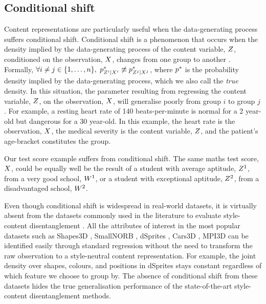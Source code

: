 \documentclass[../thesis.tex]{subfiles}
\begin{document}
\subsection{Conditional shift}

Content representations are particularly useful when the data-generating process suffers conditional shift. Conditional shift is a phenomenon that occurs when the density implied by the data-generating process of the content variable, $\myrv{z}$, conditioned on the observation, $\myrv{x}$, changes from one group to another \citep{zhangDomainAdaptationTarget2013}. Formally, $\forall i \neq j \in \{1,\dots,n\},$ $\myfunc{p}^{*}_{\myrv{z}^i | \myrv{x}^i} \not\equiv \myfunc{p}^{*}_{\myrv{z}^j | \myrv{x}^j}$, where $p^{*}$ is the probability density implied by the data-generating process, which we also call the \textit{true} density.  In this situation, the parameter resulting from regressing the content variable, $\myrv{z}$, on the observation, $\myrv{x}$, will generalise poorly from group $i$ to group $j$. For example, a resting heart rate of 140 beats-per-minute is normal for a 2 year-old but dangerous for a 30 year-old. In this example, the heart rate is the observation, $\myrv{x}$, the medical severity is the content variable, $\myrv{z}$, and the patient's age-bracket constitutes the group.

Our test score example suffers from conditional shift. The same maths test score, $\myrv{x}$, could be equally well be the result of a student with average aptitude, $\myrv{z}^1$, from a very good school, $\myrv{w}^1$, or a student with exceptional aptitude, $\myrv{z}^2$, from a disadvantaged school, $\myrv{w}^2$. 


Even though conditional shift is widespread in real-world datasets, it is virtually absent from the datasets commonly used in the literature to evaluate style-content disentanglement \citep{liuNeedLanguageDescribing2023}. All the attributes of interest in the most popular datasets such as Shapes3D \citep{kim2018disentangling}, SmallNORB \citep{lecun2004learning}, dSprites \citep{higgins2016beta}, Cars3D \citep{reedDeepVisualAnalogyMaking2015}, MPI3D \citep{gondalTransferInductiveBias2019} can be identified easily through standard regression without the need to transform the raw observation to a style-neutral content representation. For example, the joint density over shapes, colours, and positions in dSprites \citep{higginsVVAELearningBasic2017} stays constant regardless of which feature we choose to group by.  The absence of conditional shift from these datasets hides the true generalisation performance of the state-of-the-art style-content disentanglement methods.
\end{document}
